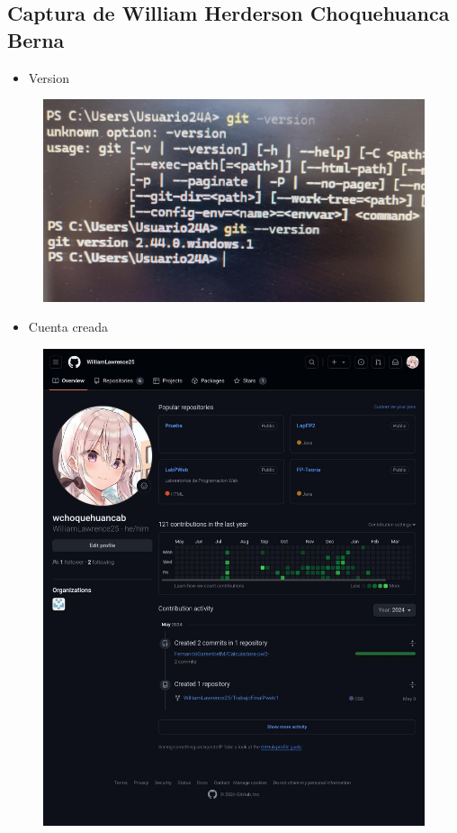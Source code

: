 \documentclass{article}
\begin{document}
	\subsection{Captura de William Herderson Choquehuanca Berna}
	\begin{itemize}
		\item Version
	\end{itemize}
	\begin{figure}[H]
		\centering
		\includegraphics[width=1.0\textwidth,keepaspectratio]{img/WilliamVersion.jpg}
	\end{figure}
	\begin{itemize}
		\item Cuenta creada
	\end{itemize}
	\begin{figure}[H]
		\centering
		\includegraphics[width=1.0\textwidth,keepaspectratio]{img/WilliamCuenta.jpg}
	\end{figure}
	\clearpage
	
\end{document}
